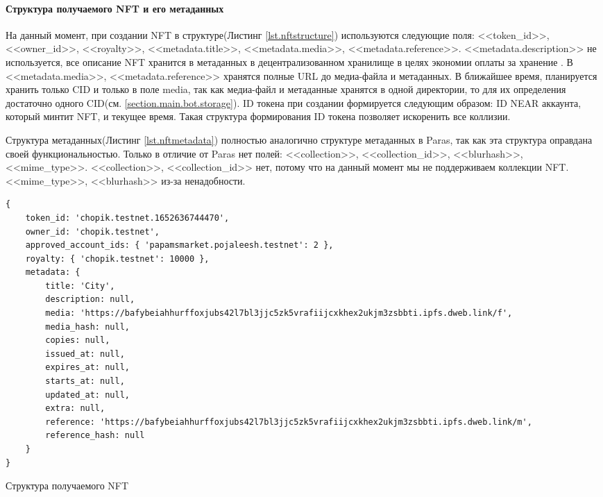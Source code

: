 \paragraph{Структура получаемого NFT и его метаданных}
\label{section.main.bot.struct}
На данный момент, при создании NFT в структуре(Листинг {\color{blue}\ref{lst.nftstructure}}) используются следующие поля: <<token\_id>>, <<owner\_id>>, <<royalty>>, <<metadata.title>>, <<metadata.media>>, <<metadata.reference>>. <<metadata.description>> не используется, все описание NFT хранится в метаданных в децентрализованном хранилище в целях экономии оплаты за хранение . В <<metadata.media>>, <<metadata.reference>> хранятся полные URL до медиа-файла и метаданных. В ближайшее время, планируется хранить только CID и только в поле media, так как медиа-файл и метаданные хранятся в одной директории, то для их определения достаточно одного CID(см. {\color{blue} \ref{section.main.bot.storage}}). ID токена при создании формируется следующим образом: ID NEAR аккаунта, который минтит NFT, и текущее время. Такая структура формирования ID токена позволяет искоренить все коллизии.

Структура метаданных(Листинг {\color{blue}\ref{lst.nftmetadata}}) полностью аналогично структуре метаданных в Paras, так как эта структура оправдана своей функциональностью. Только в отличие от Paras нет полей: <<collection>>, <<collection\_id>>, <<blurhash>>, <<mime\_type>>. <<collection>>, <<collection\_id>> нет, потому что на данный момент мы не поддерживаем коллекции NFT. <<mime\_type>>, <<blurhash>> из-за ненадобности.

\begin{listing}
\begin{verbatim}
{
    token_id: 'chopik.testnet.1652636744470',
    owner_id: 'chopik.testnet',
    approved_account_ids: { 'papamsmarket.pojaleesh.testnet': 2 },
    royalty: { 'chopik.testnet': 10000 },
    metadata: {
        title: 'City',
        description: null,
        media: 'https://bafybeiahhurffoxjubs42l7bl3jjc5zk5vrafiijcxkhex2ukjm3zsbbti.ipfs.dweb.link/f',
        media_hash: null,
        copies: null,
        issued_at: null,
        expires_at: null,
        starts_at: null,
        updated_at: null,
        extra: null,
        reference: 'https://bafybeiahhurffoxjubs42l7bl3jjc5zk5vrafiijcxkhex2ukjm3zsbbti.ipfs.dweb.link/m',
        reference_hash: null
    }
}
\end{verbatim}
\caption{Структура получаемого NFT}
\label{lst.nftstructure}
\end{listing}

